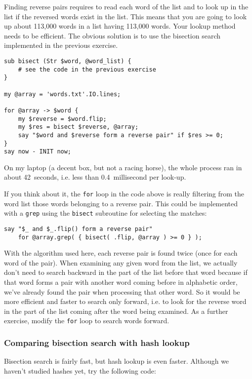 {Finding reverse pairs requires to read each word of 
the list and to look up in the list if the reversed 
words exist in the list. This means that you are 
going to look up about 113,000 words in a list having 
113,000 words. Your lookup method needs to be efficient.
The obvious solution is to use the bisection search 
implemented in the previous exercise.

\begin{verbatim}
sub bisect (Str $word, @word_list) {
    # see the code in the previous exercise
}

my @array = 'words.txt'.IO.lines;

for @array -> $word {
    my $reverse = $word.flip;
    my $res = bisect $reverse, @array;
    say "$word and $reverse form a reverse pair" if $res >= 0;
}
say now - INIT now;
\end{verbatim}

On my laptop (a decent box, but not a racing horse), 
the whole process ran in about 42~seconds, i.e. 
less than 0.4~millisecond per look-up.

If you think about it, the {\tt for} loop in the code 
above is really filtering from the word list those words 
belonging to a reverse pair. This could be implemented 
with a {\tt grep} using the {\tt bisect} subroutine for 
selecting the matches:

\begin{verbatim}
say "$_ and $_.flip() form a reverse pair" 
    for @array.grep( { bisect( .flip, @array ) >= 0 } );
\end{verbatim}

With the algorithm used here, each reverse pair is found 
twice (once for each word of the pair). When examining 
any given word from the list, we actually don't need to 
search backward in the part of the list before that word because 
if that word forms a pair with another word coming before in 
alphabetic order, we've already found the pair when 
processing that other word. So it would be more efficient and 
faster to search only forward, i.e. to look for the reverse 
word in the part of the list coming after the word being 
examined. As a further exercise, modify the {\tt for} loop 
to search words forward.

\subsubsection{Comparing bisection search with hash lookup}

Bisection search is fairly fast, but hash lookup is 
even faster. Although we haven't studied hashes yet, 
try the following code:

}
